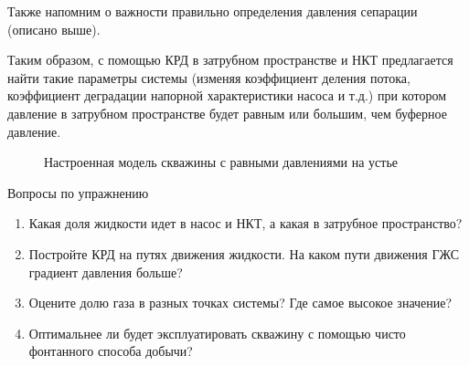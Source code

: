 Также напомним о важности правильно определения давления сепарации (описано выше). 

Таким образом, с помощью КРД в затрубном пространстве и НКТ предлагается найти такие параметры системы (изменяя коэффициент деления потока, коэффициент деградации напорной характеристики насоса и т.д.) при котором давление в затрубном пространстве будет равным или большим, чем буферное давление.

\begin{figure}[h!]
	\center{\texttt{[image: Ex110\_2]}}
	\caption{Настроенная модель скважины с равными давлениями на устье}
	\label{ris:Ex110_2}
\end{figure}

Вопросы по упражнению
\begin{enumerate}
	\item  Какая доля жидкости идет в насос и НКТ, а какая в затрубное пространство?
	\item  Постройте КРД на путях движения жидкости. На каком пути движения ГЖС градиент давления больше?
	\item Оцените долю газа в разных точках системы? Где самое высокое значение?
	\item Оптимальнее ли будет эксплуатировать скважину с помощью чисто фонтанного способа добычи?
\end{enumerate}